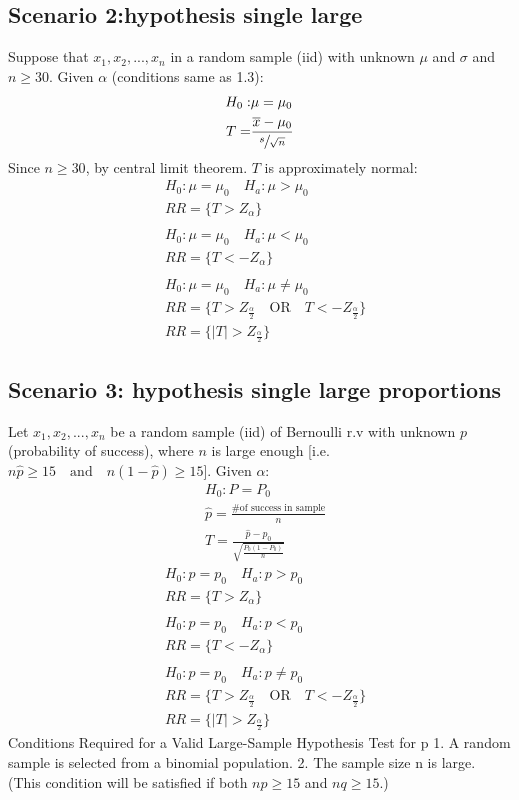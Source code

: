 \documentclass[fontsize=6pt, paper=a4]{scrartcl}
\begin{document}
\begin{multicols*}{4}
{\subsection{Scenario 2:hypothesis single large}
Suppose that $x_1, x_2,...,x_n$ in a random sample (iid) with unknown $\mu$ and $\sigma$ and \underline{$n \geq 30$}. Given $\alpha$ (conditions same as 1.3):
\begin{align}
	H_0:&\mu=\mu_0\\
	T=&\frac{\overline{x}-\mu_0}{\sfrac{s}{\sqrt{n}}}
\end{align}
Since $n \geq 30$, by central limit theorem. $T$ is approximately normal:
\begin{align}
	&H_0:\mu=\mu_0 \quad H_a:\mu >\mu_0\\
	&RR= \{ T> Z_\alpha \}\\ \\
	&H_0:\mu=\mu_0 \quad H_a:\mu <\mu_0\\
	&RR= \{ T< -Z_\alpha \}\\ \\
	&H_0:\mu=\mu_0 \quad H_a:\mu \neq \mu_0\\
	&RR= \{ T> Z_{\frac{\alpha}{2}} \quad \textrm{OR} \quad T<- Z_{\frac{\alpha}{2}} \} \\
	&RR= \{ \left|T\right|> Z_{\frac{\alpha}{2}}\}
\end{align}
\subsection{Scenario 3: hypothesis single large proportions}
Let $x_1,x_2,...,x_n$ be a random sample (iid) of Bernoulli r.v with unknown $p$ (probability of success), where $n$ is large enough [i.e. $n\widehat{p} \geq  15 \quad \textrm{and} \quad
	n(1-\widehat{p}) \geq  15$]. Given $\alpha$:
	\begin{align}
	&H_0:P=P_0\\
	&\widehat{p}=\frac{\# \textrm{of success in sample}}{n}\\
	&T=\frac{\widehat{p}-p_0}{\sqrt{\frac{P_0(1-P_0)}{n}}}
\end{align}
\begin{align}
	&H_0:p=p_0 \quad H_a:p >p_0\\
	&RR= \{ T> Z_\alpha \}\\ \\
	&H_0:p=p_0 \quad H_a:p <p_0\\
	&RR= \{ T< -Z_\alpha \}\\ \\
	&H_0:p=p_0 \quad H_a:p \neq p_0\\
	&RR= \{ T> Z_{\frac{\alpha}{2}} \quad \textrm{OR} \quad T<- Z_{\frac{\alpha}{2}} \} \\
	&RR= \{ \left|T\right|> Z_{\frac{\alpha}{2}}\}
\end{align}
	Conditions Required for a Valid Large-Sample Hypothesis Test for p
1. A random sample is selected from a binomial population.
2. The sample size n is large. (This condition will be satisfied if both $np\geq 15$ and $nq \geq 15$.)
}
\end{multicols*}
\end{document}
